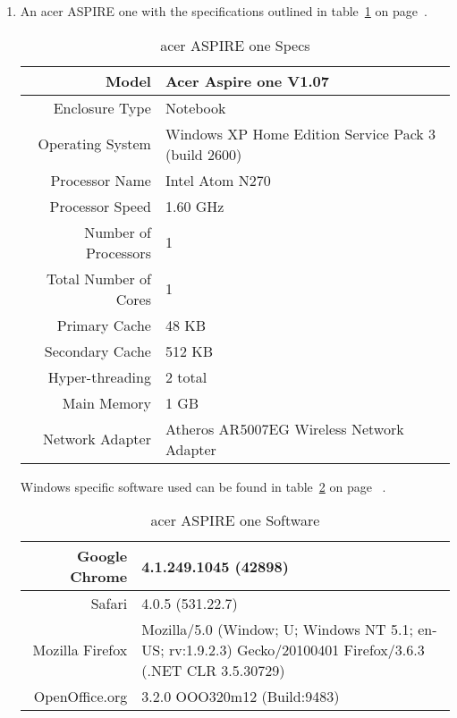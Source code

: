 \begin{enumerate}
\item An acer ASPIRE one with the specifications outlined in table~\ref{aspireSpecs} on page~\pageref{aspireSpecs}.

  \begin{table}
    \begin{tabular}{| r | p{5cm} |}
      \hline
      Model                        & Acer Aspire one V1.07 \\ \hline
      Enclosure Type               & Notebook \\ \hline
      Operating System             & Windows XP Home Edition Service Pack 3 (build
                                     2600) \\ \hline
      Processor Name               & Intel Atom N270 \\ \hline
      Processor Speed              & 1.60 GHz \\ \hline
      Number of Processors         & 1 \\ \hline
      Total Number of Cores        & 1 \\ \hline
      Primary Cache                & 48 KB \\ \hline
      Secondary Cache              & 512 KB \\ \hline
      Hyper-threading              & 2 total \\ \hline
      Main Memory                  & 1 GB \\ \hline
      Network Adapter              & Atheros AR5007EG Wireless Network Adapter \\
      \hline
    \end{tabular}
    \caption{acer ASPIRE one Specs}
    \label{aspireSpecs}
  \end{table}

  Windows specific software used can be found in table~\ref{aspireSoftware} on page ~\pageref{aspireSoftware}.

  \begin{table}
    \begin{tabular}{| r | p{5cm} |}
      \hline
      Google Chrome                & 4.1.249.1045 (42898) \\ \hline
      Safari                       & 4.0.5 (531.22.7) \\ \hline
      Mozilla Firefox              & Mozilla/5.0 (Window; U; Windows NT 5.1;
      en-US; rv:1.9.2.3) Gecko/20100401
      Firefox/3.6.3 (.NET CLR 3.5.30729) \\ \hline
      OpenOffice.org               & 3.2.0 OOO320m12 (Build:9483) \\
      \hline
    \end{tabular}
    \caption{acer ASPIRE one Software}
    \label{aspireSoftware}
  \end{table}


\end{enumerate}
